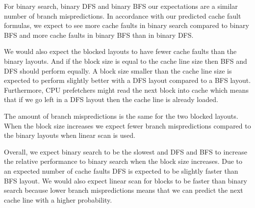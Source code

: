 For binary search, binary DFS and binary BFS our expectations are a similar number of branch mispredictions. In accordance with our predicted cache fault formulas, we expect to see more cache faults in binary search compared to binary BFS and more cache faults in binary BFS than in binary DFS.

We would also expect the blocked layouts to have fewer cache faults than the binary layouts. And if the block size is equal to the cache line size then BFS and DFS should perform equally. A block size smaller than the cache line size is expected to perform slightly better with a DFS layout compared to a BFS layout. Furthermore, CPU prefetchers might read the next block into cache which means that if we go left in a DFS layout then the cache line is already loaded.

The amount of branch mispredictions is the same for the two blocked layouts. When the block size increases we expect fewer branch mispredictions compared to the binary layouts when linear scan is used.

Overall, we expect binary search to be the slowest and DFS and BFS to increase the relative performance to binary search when the block size increases. Due to an expected number of cache faults DFS is expected to be slightly faster than BFS layout. We would also expect linear scan for blocks to be faster than binary search because lower branch mispredictions means that we can predict the next cache line with a higher probability.